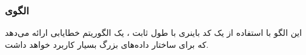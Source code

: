 \subsubsection{الگوی }
\label{safeCRCSec}
\begin{RTL}
این الگو با استفاده از یک کد باینری با طول ثابت ،
یک الگوریتم خطایابی ارائه می‌دهد که برای ساختار داده‌های
بزرگ بسیار کاربرد خواهد داشت.
\end{RTL}